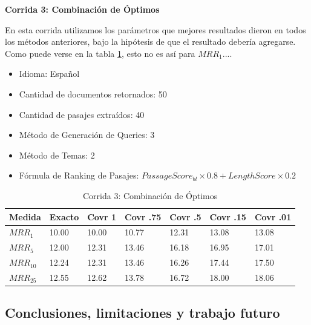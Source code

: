 \textbf{Corrida 3: Combinación de Óptimos}\newline

En esta corrida utilizamos los parámetros que mejores resultados dieron en todos los métodos anteriores, bajo la hipótesis de que el resultado debería agregarse. Como puede verse en la tabla \ref{table:optimos}, esto no es así para $MRR_1$....\newline


\begin{itemize}
  \item Idioma: Español
  \item Cantidad de documentos retornados: 50
  \item Cantidad de pasajes extraídos: 40
  \item Método de Generación de Queries: 3
  \item Método de Temas: 2
  \item Fórmula de Ranking de Pasajes:  $PassageScore_{bl} \times 0.8 + LengthScore \times 0.2$
\end{itemize}

\begin{table}[H]
\centering
\begin{center}
\begin{tabular}{|l | l | l | l | l | l | l |}
\hline
Medida & Exacto & Covr 1 & Covr .75 & Covr .5 & Covr .15 & Covr .01 \\ \hline
$MRR_{1}$ & 10.00 & 10.00 & 10.77 & 12.31 & 13.08 & 13.08  \\ \hline
$MRR_{5}$ & 12.00 & 12.31 & 13.46 & 16.18 & 16.95 & 17.01  \\ \hline
$MRR_{10}$ & 12.24 & 12.31 & 13.46 & 16.26 & 17.44 & 17.50  \\ \hline
$MRR_{25}$ & 12.55 & 12.62 & 13.78 & 16.72 & 18.00 & 18.06  \\ \hline
\end{tabular}
\label{table:optimos}

\medskip

\caption{Corrida 3: Combinación de Óptimos}
\end{center}
\end{table}

\subsection{Conclusiones, limitaciones y trabajo futuro}
\label{sec:clef-cierre}




